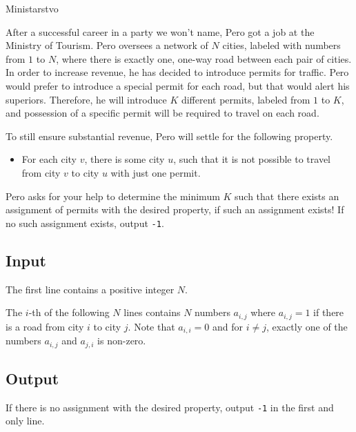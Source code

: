 \begin{statement}[
  problempoints=100,
  timelimit=1 second,
  memorylimit=1024 MiB,
]{Ministarstvo}

After a successful career in a party we won't name, Pero got a job at the Ministry of Tourism. Pero oversees a network of $N$ cities, labeled with numbers from $1$ to $N$, where there is exactly one, one-way road between each pair of cities. In order to increase revenue, he has decided to introduce permits for traffic. Pero would prefer to introduce a special permit for each road, but that would alert his superiors. Therefore, he will introduce $K$ different permits, labeled from $1$ to $K$, and possession of a specific permit will be required to travel on each road.

To still ensure substantial revenue, Pero will settle for the following property.

\begin{itemize}
\item For each city $v$, there is some city $u$, such that it is not possible to travel from city $v$ to city $u$ with just one permit.
\end{itemize} 

Pero asks for your help to determine the minimum $K$ such that there exists an assignment of permits with the desired property, if such an assignment exists! If no such assignment exists, output \texttt{-1}. 

\subsection*{Input}

The first line contains a positive integer $N$.

The $i$-th of the following $N$ lines contains $N$ numbers $a_{i, j}$ where $a_{i, j} = 1$ if there is a road from city $i$ to city $j$. Note that $a_{i, i} = 0$ and for $i \neq j$, exactly one of the numbers $a_{i, j}$ and $a_{j, i}$ is non-zero. 

\subsection*{Output}

If there is no assignment with the desired property, output \texttt{-1} in the first and only line.


\end{statement}
